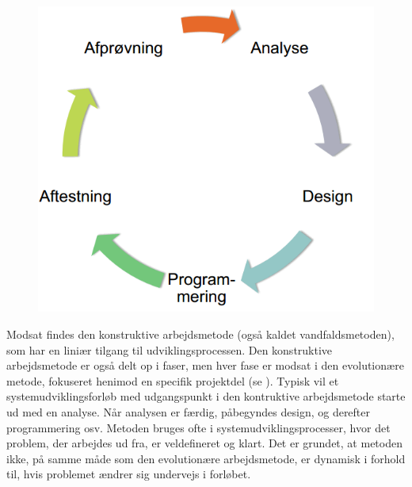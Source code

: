\begin{figure}[ht]
	\centering
	\includegraphics[scale=0.5]{billeder/evolutionaeremetode.png}
	\label{fig:evolutionaeremetode}
  \end{figure}

Modsat findes den konstruktive arbejdsmetode (også kaldet vandfaldsmetoden), som har en liniær tilgang til udviklingsprocessen. Den konstruktive arbejdsmetode er også delt op i faser, men hver fase er modsat i den evolutionære metode, fokuseret henimod en specifik projektdel (se ). Typisk vil et systemudviklingsforløb med udgangspunkt i den kontruktive arbejdsmetode starte ud med en analyse. Når analysen er færdig, påbegyndes design, og derefter programmering osv. Metoden bruges ofte i systemudviklingsprocesser, hvor det problem, der arbejdes ud fra, er veldefineret og klart. Det er grundet, at metoden ikke, på samme måde som den evolutionære arbejdsmetode, er dynamisk i forhold til, hvis problemet ændrer sig undervejs i forløbet.

